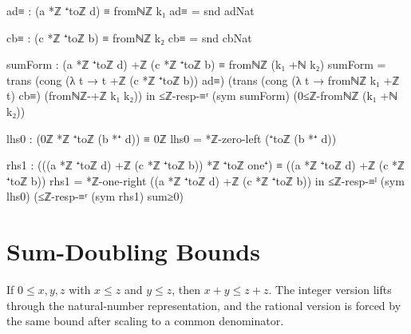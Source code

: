 \documentclass[11pt,a4paper]{book}
\begin{document}
\begin{code}
        ad≡ : (a *ℤ ⁺toℤ d) ≡ fromℕℤ k₁
        ad≡ = snd adNat

        cb≡ : (c *ℤ ⁺toℤ b) ≡ fromℕℤ k₂
        cb≡ = snd cbNat

        sumForm : (a *ℤ ⁺toℤ d) +ℤ (c *ℤ ⁺toℤ b) ≡ fromℕℤ (k₁ +ℕ k₂)
        sumForm =
          trans
            (cong (λ t → t +ℤ (c *ℤ ⁺toℤ b)) ad≡)
            (trans
              (cong (λ t → fromℕℤ k₁ +ℤ t) cb≡)
              (fromℕℤ-+ℤ k₁ k₂))
      in
      ≤ℤ-resp-≡ʳ (sym sumForm) (0≤ℤ-fromℕℤ (k₁ +ℕ k₂))

    lhs0 : (0ℤ *ℤ ⁺toℤ (b *⁺ d)) ≡ 0ℤ
    lhs0 = *ℤ-zero-left (⁺toℤ (b *⁺ d))

    rhs1 : (((a *ℤ ⁺toℤ d) +ℤ (c *ℤ ⁺toℤ b)) *ℤ ⁺toℤ one⁺) ≡ ((a *ℤ ⁺toℤ d) +ℤ (c *ℤ ⁺toℤ b))
    rhs1 = *ℤ-one-right ((a *ℤ ⁺toℤ d) +ℤ (c *ℤ ⁺toℤ b))
  in
  ≤ℤ-resp-≡ˡ (sym lhs0) (≤ℤ-resp-≡ʳ (sym rhs1) sum≥0)
\end{code}

\section{Sum-Doubling Bounds}

If $0 \le x, y, z$ with $x \le z$ and $y \le z$, then
$x + y \le z + z$.  The integer version lifts through the natural-number
representation, and the rational version is forced by the same bound after
scaling to a common denominator.
\end{document}

